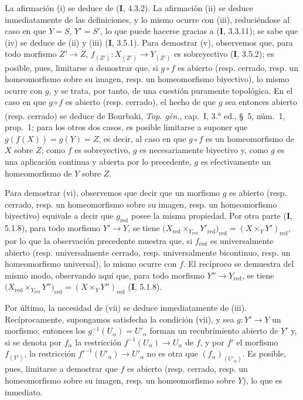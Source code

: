La afirmación (i) se deduce de (\textbf I, 4.3.2). La afirmación (ii) se deduce
inmediatamente de las definiciones, y lo mismo ocurre con (iii), reduciéndose
al caso en que $Y=S$, $Y'=S'$, lo que puede hacerse gracias a (\textbf I, 3.3.11);
se sabe que (iv) se deduce de (ii) y (iii) (\textbf I, 3.5.1). Para demostrar (v),
observemos que, para todo morfismo $Z'\to Z$,
$f_{(Z')}:X_{(Z')}\to Y_{(Z')}$ es sobreyectivo
(\textbf I, 3.5.2); es posible, pues, limitarse a demostrar que, si $g\circ f$ es
abierto (resp. cerrado, resp. un
homeomorfismo sobre su imagen, resp. un homeomorfismo biyectivo), lo mismo
ocurre con $g$, y se trata, por tanto, de una cuestión puramente topológica.
En el caso en que $g\circ f$ es abierto (resp. cerrado), el hecho de que $g$
sea entonces abierto (resp. cerrado) se deduce de Bourbaki,
\emph{Top. gén.}, cap.~I, 3.\textsuperscript{a} ed., \S~5, núm.~1, prop.~1;
para los otros dos casos, es posible limitarse a suponer que
$g(f(X))=g(Y)=Z$, es decir, al caso en que $g\circ f$ es un homeomorfismo de
$X$ sobre $Z$; como $f$ es sobreyectivo, $g$ es necesariamente biyectivo y,
como $g$ es una aplicación continua y abierta por lo precedente, $g$ es
efectivamente un homeomorfismo de $Y$ sobre $Z$.

Para demostrar (vi), observemos que decir que un morfismo $g$ es abierto
(resp. cerrado, resp. un homeomorfismo sobre su imagen, resp. un
homeomorfismo biyectivo) equivale a decir que $g_{\mathrm{red}}$ posee la
misma propiedad. Por otra parte (\textbf I, 5.1.8), para todo morfismo $Y'\to Y$, se
tiene
$\bigl(X_{\mathrm{red}}\times_{Y_{\mathrm{red}}}Y'_{\mathrm{red}}\bigr)_{\mathrm{red}}
=(X\times_Y Y')_{\mathrm{red}}$,
por lo que la observación precedente muestra que, si $f_{\mathrm{red}}$ es
universalmente abierto (resp. universalmente cerrado, resp. universalmente
bicontinuo, resp. un homeomorfismo universal), lo mismo ocurre con $f$. El
recíproco se demuestra del mismo modo, observando aquí que, para todo morfismo
$Y''\to Y_{\mathrm{red}}$, se tiene
$\bigl(X_{\mathrm{red}}\times_{Y_{\mathrm{red}}}Y''\bigr)_{\mathrm{red}}
=(X\times_Y Y'')_{\mathrm{red}}$
(\textbf{I}, 5.1.8).

Por último, la necesidad de (vii) se deduce inmediatamente de (iii).
Recíprocamente, supongamos satisfecha la condición (vii), y sea
$g:Y'\to Y$ un morfismo; entonces los
$g^{-1}(U_\alpha)=U'_\alpha$ forman un recubrimiento abierto de $Y'$ y, si
se denota por $f_\alpha$ la restricción
$f^{-1}(U_\alpha)\to U_\alpha$ de $f$, y por $f'$ el morfismo
$f_{(Y')}$, la restricción
$f'^{-1}(U'_\alpha)\to U'_\alpha$ no es otra que
$(f_\alpha)_{(U'_\alpha)}$. Es posible, pues, limitarse a demostrar que $f$ es
abierto (resp. cerrado, resp. un homeomorfismo sobre su imagen, resp. un
homeomorfismo sobre $Y$), lo que es inmediato.
